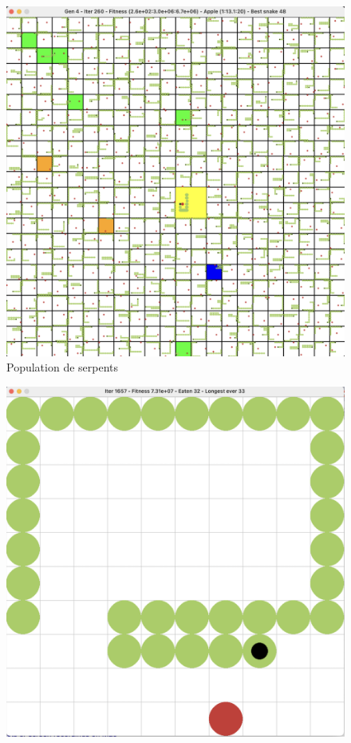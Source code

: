 \documentclass[10pt]{beamer}
\begin{document}
\begin{frame}
\begin{columns}[T]
\begin{column}{0.24\textwidth}
\begin{figure}
\includegraphics[width=1\textwidth]{snake_population.png}
\caption*{\tiny Population de serpents}
\end{figure}
\begin{figure}
\centering
\vspace{-1cm}\hspace{-0.6cm}
\includegraphics[width=1\textwidth]{snake_game.png}

\end{figure}
\end{column}
\end{columns}
\end{frame}
\end{document}
